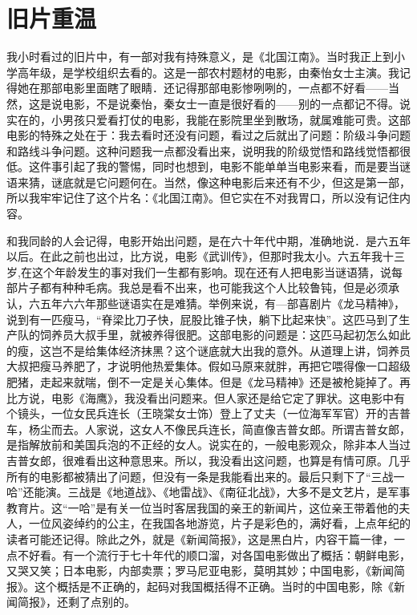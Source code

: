 \chapter{旧片重温}

我小时看过的旧片中，有一部对我有持殊意义，是《北国江南》。当时我正上到小学高年级，是学校组织去看的。这是一部农村题材的电影，由秦怡女士主演。我记得她在那部电影里面瞎了眼睛．还记得那部电影惨咧咧的，一点都不好看——当然，这是说电影，不是说秦怡，秦女士一直是很好看的——别的一点都记不得。说实在的，小男孩只爱看打仗的电影，我能在影院里坐到散场，就属难能可贵。这部电影的特殊之处在于：我去看时还没有问题，看过之后就出了问题：阶级斗争问题和路线斗争问题。这种问题我一点都没看出来，说明我的阶级觉悟和路线觉悟都很低。这件事引起了我的警惕，同时也想到，电影不能单单当电影来看，而是要当谜语来猜，谜底就是它问题何在。当然，像这种电影后来还有不少，但这是第一部，所以我牢牢记住了这个片名：《北国江南》。但它实在不对我胃口，所以没有记住内容。 

和我同龄的人会记得，电影开始出问题，是在六十年代中期，准确地说．是六五年以后。在此之前也出过，比方说，电影《武训传》，但那时我太小。六五年我十三岁,在这个年龄发生的事对我们一生都有影响。现在还有人把电影当谜语猜，说每部片子都有种种毛病。我总是看不出来，也可能我这个人比较鲁钝，但是必须承认，六五年六六年那些谜语实在是难猜。举例来说，有—部喜剧片《龙马精神》，说到有一匹瘦马，“脊梁比刀子快，屁股比锥子快，躺下比起来快”。这匹马到了生产队的饲养员大叔手里，就被养得很肥。这部电影的问题是：这匹马起初怎么如此的瘦，这岂不是给集体经济抹黑？这个谜底就大出我的意外。从道理上讲，饲养员大叔把瘦马养肥了，才说明他热爱集体。假如马原来就胖，再把它喂得像一口超级肥猪，走起来就喘，倒不一定是关心集体。但是《龙马精神》还是被枪毙掉了。再比方说，电影《海鹰》，我没看出问题来。但人家还是给它定了罪状。这电影中有个镜头，一位女民兵连长（王晓棠女士饰）登上了丈夫（一位海军军官）开的吉普车，杨尘而去。人家说，这女人不像民兵连长，简直像吉普女郎。所谓吉普女郎，是指解放前和美国兵泡的不正经的女人。说实在的，一般电影观众，除非本人当过吉普女郎，很难看出这种意思来。所以，我没看出这问题，也算是有情可原。几乎所有的电影都被猜出了问题，但没有一条是我能看出来的。最后只剩下了“三战一哈”还能演。三战是《地道战》、《地雷战》、《南征北战》，大多不是文艺片，是军事教育片。这“一哈”是有关一位当时客居我国的亲王的新闻片，这位亲王带着他的夫人，一位风姿绰约的公主，在我国各地游览，片子是彩色的，满好看，上点年纪的读者可能还记得。除此之外，就是《新闻简报》，这是黑白片，内容干篇一律，一点不好看。有一个流行于七十年代的顺口溜，对各国电影做出了概括：朝鲜电影，又哭又笑；日本电影，内部卖票；罗马尼亚电影，莫明其妙；中国电影，《新闻简报》。这个概括是不正确的，起码对我国概括得不正确。当时的中国电影，除《新闻简报》，还剩了点别的。 

